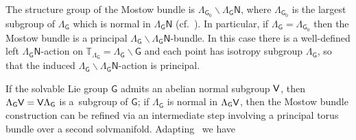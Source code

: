 \documentclass[pdftex]{sigma}
\numberwithin{equation}{section}
\def\V{{\sf V}}
\newcommand{\sfG}{\mathsf{G}}
\newcommand{\sfN}{\mathsf{N}}
\newcommand{\torus}{{\mathbb T}} %
\begin{document}
\begin{Remark}\label{rem:Mostow}
The structure group of the Mostow bundle is
$\Lambda_{\sfG_0}\backslash\Lambda_\sfG \sfN$, where $\Lambda_{\sfG_0}$ is
the largest subgroup of $\Lambda_{\sfG}$ which is normal in
$\Lambda_\sfG \sfN$ (cf.~\cite{Bock2009}).
In particular, if $\Lambda_{\sfG}=\Lambda_{\sfG_0}$ then the Mostow bundle is
a principal $\Lambda_{\sfG}\backslash\Lambda_\sfG \sfN$-bundle. In
this case there is a well-defined left $\Lambda_\sfG \sfN$-action on $\torus_{\Lambda_\sfG} =
\Lambda_\sfG\backslash\sfG$ and each point has isotropy subgroup ${\Lambda_\sfG}$,
so that the induced $\Lambda_{\sfG}\backslash\Lambda_\sfG \sfN$-action
is principal.
\end{Remark}

If the solvable Lie group $\sfG$ admits an abelian normal subgroup
$\V$, then $\Lambda_\sfG \V=\V \Lambda_\sfG$ is a~subgroup of $\sfG$; if $\Lambda_\sfG$
is normal in $\Lambda_\sfG \V$, then the Mostow bundle construction can be refined via an intermediate step
involving a principal torus bundle over a second solvmanifold.
Adapting~\cite[Theorem~3.6]{Bock2009} we have
\end{document}
